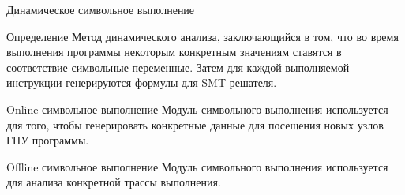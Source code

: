 \documentclass[10pt]{beamer}
\begin{document}

\begin{frame}{Динамическое символьное выполнение}
  \begin{block}{Определение}
    Метод динамического анализа, заключающийся в том, что во время выполнения программы некоторым конкретным значениям ставятся в соответствие символьные переменные. Затем для каждой выполняемой инструкции генерируются формулы для SMT-решателя.
  \end{block}
  \begin{block}{Online символьное выполнение}
    Модуль символьного выполнения используется для того, чтобы генерировать конкретные данные для посещения новых узлов ГПУ программы.
  \end{block}
  \begin{block}{Offline символьное выполнение}
    Модуль символьного выполнения используется для анализа конкретной трассы выполнения. \checkmark
  \end{block}
\end{frame}
\end{document}
